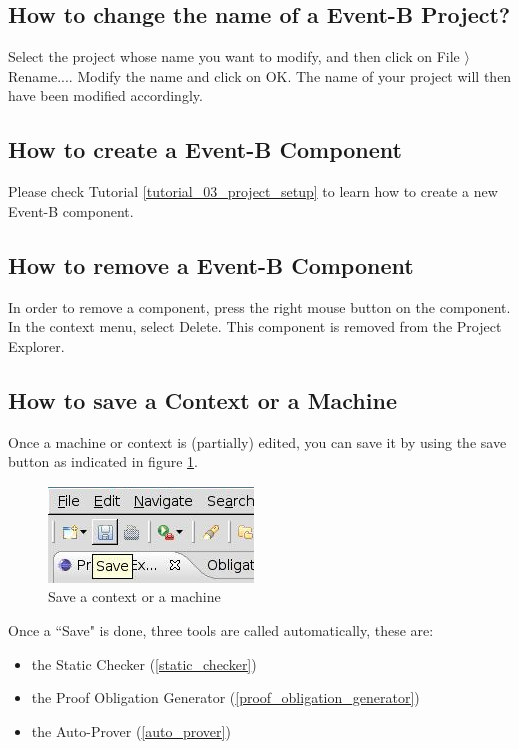 \subsection{How to change the name of a Event-B Project?}

Select the project whose name you want to modify, and then click on \textsf{File $\rangle$ Rename...}. Modify the name and click on \textsf{OK}. The name of your project will then have been modified accordingly. 

\subsection{How to create a Event-B Component}

Please check Tutorial \ref{tutorial_03_project_setup} to learn how to create a new Event-B component.

\subsection{How to remove a Event-B Component}

In order to remove a component, press the right mouse button on the component. In the context menu, select \textsf{Delete}. This component is removed from the \textsf{Project Explorer}. 

\subsection{How to save a Context or a Machine}

Once a machine or context is (partially) edited, you can save it by using the save button as indicated in figure \ref{fig_faq_saveaction}.

\begin{figure}[!h]
\begin{center}
	\includegraphics{img/faq/faq_saveaction.png}
	\caption{Save a context or a machine}
	\label{fig_faq_saveaction}
\end{center}
\end{figure}

Once a ``Save" is done, three tools are called automatically, these are:

\begin{itemize}
	\item the Static Checker (\ref{static_checker})
	\item the Proof Obligation Generator (\ref{proof_obligation_generator})
	\item the Auto-Prover (\ref{auto_prover})
\end{itemize}

